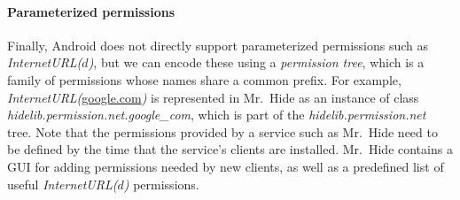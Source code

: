 \documentclass[preprint]{sig-alternate-10pt}
\newcommand{\lib}{Mr.\ Hide\xspace}
\newcommand{\perm}[1]{\textsf{\textit{#1}}}
\newcommand{\bnsp}{\hspace{0pt}} %
\newcommand{\polInternetUrlName}[1]{\perm{InternetURL(}{#1}\perm{)}\xspace}
\begin{document}
\paragraph*{Parameterized permissions}
Finally, Android does not directly support parameterized permissions
such as \polInternetUrlName{$d$}, but we can encode these using a
\emph{permission tree}, which is a family of permissions whose names
share a common prefix.  For example, \polInternetUrlName{\url{google.com}}
is represented in \lib as an instance of class
\perm{hidelib.\bnsp{}permission.\bnsp{}net.\bnsp{}google\_com}, which is
part of the \perm{hidelib.permission.net} tree. Note that the permissions
provided by a service such as \lib need to be defined by the 
time that the service's clients are installed.
\lib contains a GUI for adding permissions needed by new clients, as well as 
a predefined list of useful \polInternetUrlName{\(d\)} permissions.






\end{document}

